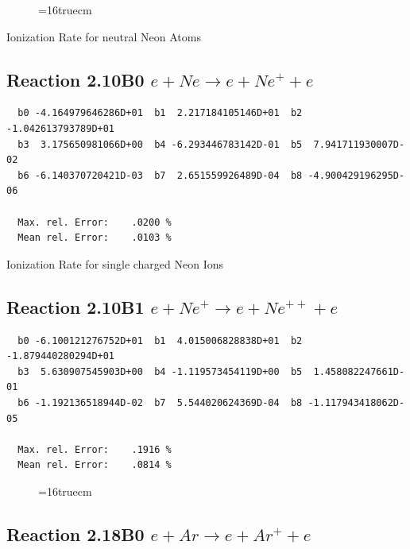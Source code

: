 \documentclass[12pt,dvips]{article}
\begin{document}
\begin{figure} \label{2.7B0}
\epsfxsize=16truecm
\end{figure}
\newpage


 Ionization Rate for neutral Neon Atoms

\subsection{
Reaction 2.10B0   $e + Ne \rightarrow e + Ne^+ + e  $
}

\begin{small}\begin{verbatim}
  b0 -4.164979646286D+01  b1  2.217184105146D+01  b2 -1.042613793789D+01
  b3  3.175650981066D+00  b4 -6.293446783142D-01  b5  7.941711930007D-02
  b6 -6.140370720421D-03  b7  2.651559926489D-04  b8 -4.900429196295D-06

  Max. rel. Error:    .0200 %
  Mean rel. Error:    .0103 %

\end{verbatim}\end{small}

 Ionization Rate for single charged Neon Ions

\subsection{
Reaction 2.10B1  $ e + Ne^+ \rightarrow e + Ne^{++} + e $
}

\begin{small}\begin{verbatim}
  b0 -6.100121276752D+01  b1  4.015006828838D+01  b2 -1.879440280294D+01
  b3  5.630907545903D+00  b4 -1.119573454119D+00  b5  1.458082247661D-01
  b6 -1.192136518944D-02  b7  5.544020624369D-04  b8 -1.117943418062D-05

  Max. rel. Error:    .1916 %
  Mean rel. Error:    .0814 %

\end{verbatim}\end{small}


\begin{figure} \label{2.10B0}
\epsfxsize=16truecm
\end{figure}

\newpage

\subsection{
Reaction 2.18B0   $e + Ar  \rightarrow e + Ar^+  + e$
}
\end{document}
